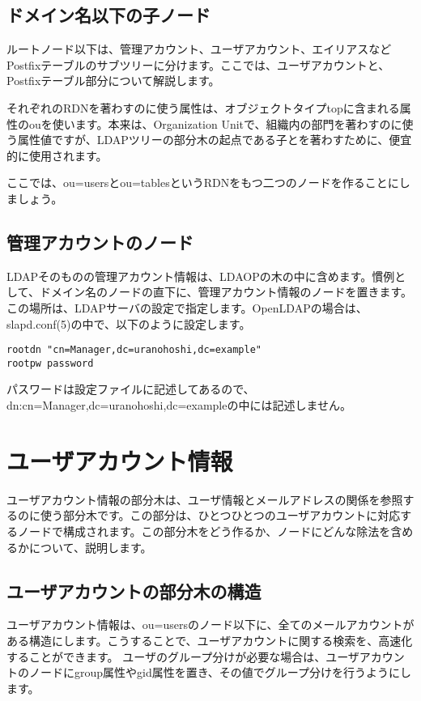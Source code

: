 \subsection{ドメイン名以下の子ノード}

ルートノード以下は、管理アカウント、ユーザアカウント、エイリアスなどPostfixテーブルのサブツリーに分けます。ここでは、ユーザアカウントと、Postfixテーブル部分について解説します。

それぞれのRDNを著わすのに使う属性は、オブジェクトタイプtopに含まれる属性のouを使います。本来は、Organization Unitで、組織内の部門を著わすのに使う属性値ですが、LDAPツリーの部分木の起点である子とを著わすために、便宜的に使用されます。

ここでは、ou=usersとou=tablesというRDNをもつ二つのノードを作ることにしましょう。

\subsection{管理アカウントのノード}

LDAPそのものの管理アカウント情報は、LDAOPの木の中に含めます。慣例として、ドメイン名のノードの直下に、管理アカウント情報のノードを置きます。この場所は、LDAPサーバの設定で指定します。OpenLDAPの場合は、slapd.conf(5)の中で、以下のように設定します。

\begin{verbatim}
rootdn "cn=Manager,dc=uranohoshi,dc=example"
rootpw password
\end{verbatim}

パスワードは設定ファイルに記述してあるので、dn:cn=Manager,dc=uranohoshi,dc=exampleの中には記述しません。

\section{ユーザアカウント情報}

ユーザアカウント情報の部分木は、ユーザ情報とメールアドレスの関係を参照するのに使う部分木です。この部分は、ひとつひとつのユーザアカウントに対応するノードで構成されます。この部分木をどう作るか、ノードにどんな除法を含めるかについて、説明します。

\subsection{ユーザアカウントの部分木の構造}

ユーザアカウント情報は、ou=usersのノード以下に、全てのメールアカウントがある構造にします。こうすることで、ユーザアカウントに関する検索を、高速化することができます。
ユーザのグループ分けが必要な場合は、ユーザアカウントのノードにgroup属性やgid属性を置き、その値でグループ分けを行うようにします。

